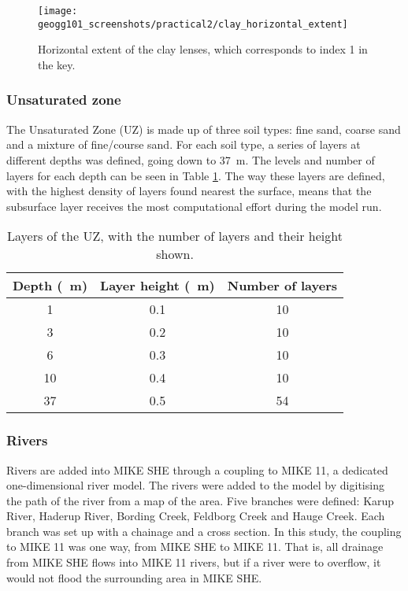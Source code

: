 \documentclass{article}
\begin{document}
\begin{figure}[!h]
    \centering
    \texttt{[image: geogg101\_screenshots/practical2/clay\_horizontal\_extent]}
    \caption{Horizontal extent of the clay lenses, which corresponds to index 1 in the key.}
    \label{fig:clay_horizontal_extent}
\end{figure}

\subsubsection{Unsaturated zone}

The Unsaturated Zone (UZ) is made up of three soil types: fine sand, coarse sand and a mixture of fine/course sand. For each soil type, a series of layers at different depths was defined, going down to \SI{37}{m}. The levels and number of layers for each depth can be seen in Table \ref{table:uz_depths}. The way these layers are defined, with the highest density of layers found nearest the surface, means that the subsurface layer receives the most computational effort during the model run.

\setlength\extrarowheight{3pt}
\begin{table}[!h]
    \centering
    \begin{tabular}{c c c}
	Depth (\SI{}{m})  & Layer height (\SI{}{m}) & Number of layers \\
	    \hline
	    1 & 0.1 & 10 \\
	    3 & 0.2 & 10 \\
	    6 & 0.3 & 10 \\
	    10 & 0.4 & 10 \\
	    37 & 0.5 & 54 \\
    \end{tabular}
    \caption{Layers of the UZ, with the number of layers and their height shown.}
    \label{table:uz_depths}
\end{table}



\subsubsection{Rivers}

Rivers are added into MIKE SHE through a coupling to MIKE 11, a dedicated one-dimensional river model. The rivers were added to the model by digitising the path of the river from a map of the area. Five branches were defined: Karup River, Haderup River, Bording Creek, Feldborg Creek and Hauge Creek. Each branch was set up with a chainage and a cross section. In this study, the coupling to MIKE 11 was one way, from MIKE SHE to MIKE 11. That is, all drainage from MIKE SHE flows into MIKE 11 rivers, but if a river were to overflow, it would not flood the surrounding area in MIKE SHE.
\end{document}
